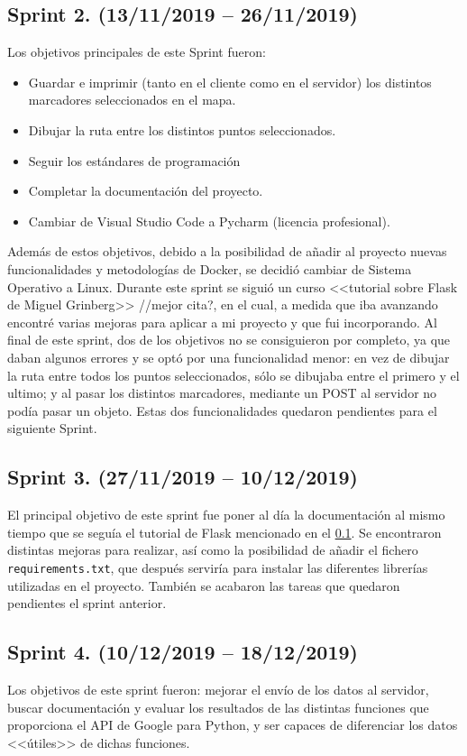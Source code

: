 \subsection{Sprint 2. (13/11/2019 -- 26/11/2019)} \label{sprint2}
Los objetivos principales de este Sprint fueron: 
\begin{itemize}
	\item Guardar e imprimir (tanto en el cliente como en el servidor) los distintos marcadores seleccionados en el mapa.
	\item Dibujar la ruta entre los distintos puntos seleccionados.
	\item Seguir los estándares de programación
	\item Completar la documentación del proyecto.
	\item Cambiar de Visual Studio Code a Pycharm (licencia profesional).
\end{itemize}
Además de estos objetivos, debido a la posibilidad de añadir al proyecto nuevas funcionalidades y metodologías de Docker, se decidió cambiar de Sistema Operativo a Linux.
Durante este sprint se siguió un curso <<tutorial sobre Flask de Miguel Grinberg>> //mejor cita?, en el cual, a medida que iba avanzando encontré varias mejoras para aplicar a mi proyecto y que fui incorporando.
Al final de este sprint, dos de los objetivos no se consiguieron por completo, ya que daban algunos errores y se optó por una funcionalidad menor: en vez de dibujar la ruta entre todos los puntos seleccionados, sólo se dibujaba entre el primero y el ultimo; y al pasar los distintos marcadores, mediante un POST al servidor no podía pasar un objeto. Estas dos funcionalidades quedaron pendientes para el siguiente Sprint.

\subsection{Sprint 3. (27/11/2019 -- 10/12/2019)}
El principal objetivo de este sprint fue poner al día la documentación al mismo tiempo que se seguía el tutorial de Flask mencionado en el \ref{sprint2}.
Se encontraron distintas mejoras para realizar, así como la posibilidad de añadir el fichero \texttt{requirements.txt}, que después serviría para instalar las diferentes librerías utilizadas en el proyecto.
También se acabaron las tareas que quedaron pendientes el sprint anterior.

\subsection{Sprint 4. (10/12/2019 -- 18/12/2019)}
Los objetivos de este sprint fueron: mejorar el envío de los datos al servidor, buscar documentación y evaluar los resultados de las distintas funciones que proporciona el API de Google para Python, y ser capaces de diferenciar los datos <<útiles>> de dichas funciones.

